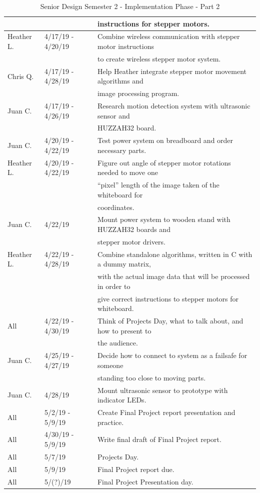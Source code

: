 \begin{table} [H]
\begin{tabular}{|l|l|l|}
					&					& instructions for stepper motors. \\
		\hline
		Heather L. & 4/17/19 - 4/20/19 	& Combine wireless communication with stepper motor instructions \\
					&					& to create wireless stepper motor system. \\
		\hline
		Chris Q. & 4/17/19 - 4/28/19 	& Help Heather integrate stepper motor movement algorithms and \\
					&					& image processing program. \\
		\hline
		Juan C. & 4/17/19 - 4/26/19 	& Research motion detection system with ultrasonic sensor and \\
					&					& HUZZAH32 board. \\
		\hline
		Juan C. & 4/20/19 - 4/22/19 	& Test power system on breadboard and order necessary parts. \\
		\hline
		Heather L. & 4/20/19 - 4/22/19 	& Figure out angle of stepper motor rotations needed to move one \\
					&					& ``pixel'' length of the image taken of the whiteboard for \\
					&					& coordinates. \\
				\hline
		Juan C. & 4/22/19 				& Mount power system to wooden stand with HUZZAH32 boards and \\
					&					& stepper motor drivers. \\
		\hline
		Heather L. & 4/22/19 - 4/28/19 	& Combine standalone algorithms, written in C with a dummy matrix, \\
				&						& with the actual image data that will be processed in order to \\
				&						& give correct instructions to stepper motors for whiteboard. \\
		\hline
		All & 4/22/19 - 4/30/19 		& Think of Projects Day, what to talk about, and how to present to \\
				&						& the audience. \\
		\hline
		Juan C. & 4/25/19 - 4/27/19 	& Decide how to connect to system as a failsafe for someone \\
					&					& standing too close to moving parts. \\
		\hline
		Juan C. & 4/28/19 				& Mount ultrasonic sensor to prototype with indicator LEDs. \\
		\hline
		All & 5/2/19 - 5/9/19 			& Create Final Project report presentation and practice. \\
		\hline
		All & 4/30/19 - 5/9/19 			& Write final draft of Final Project report. \\
		\hline
		All & 5/7/19 					& Projects Day. \\
		\hline
		All & 5/9/19 					& Final Project report due. \\
		\hline
		All & 5/(?)/19 					& Final Project Presentation day. \\
		\hline
	\end{tabular} 
	\caption{Senior Design Semester 2 - Implementation Phase - Part 2}
	\label{table:5}
\end{table}

